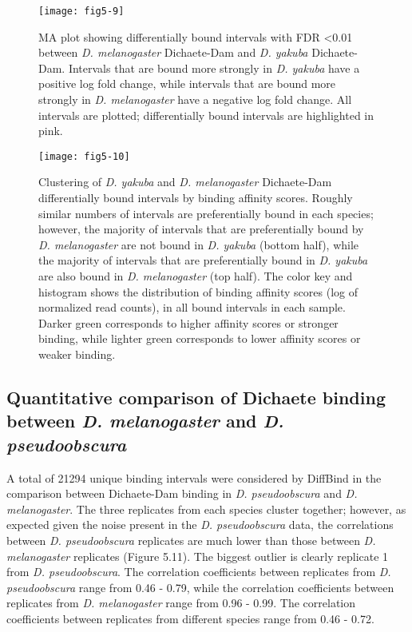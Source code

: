 \begin{figure}
\centering
\texttt{[image: fig5-9]}
\caption[Differentially bound intervals with FDR \textless 0.01 between \emph{D. melanogaster} Dichaete-Dam and \emph{D. yakuba} Dichaete-Dam]{MA plot showing differentially bound intervals with FDR \textless 0.01 between \emph{D. melanogaster} Dichaete-Dam and \emph{D. yakuba} Dichaete-Dam. Intervals that are bound more strongly in \emph{D. yakuba} have a positive log fold change, while intervals that are bound more strongly in \emph{D. melanogaster} have a negative log fold change. All intervals are plotted; differentially bound intervals are highlighted in pink.}
\label{Figure 5.9}
\end{figure}

\begin{figure}
\centering
\texttt{[image: fig5-10]}
\caption[Clustering of \emph{D. yakuba} and \emph{D. melanogaster} Dichaete-Dam differentially bound intervals by binding affinity scores]{Clustering of \emph{D. yakuba} and \emph{D. melanogaster} Dichaete-Dam differentially bound intervals by binding affinity scores. Roughly similar numbers of intervals are preferentially bound in each species; however, the majority of intervals that are preferentially bound by \emph{D. melanogaster} are not bound in \emph{D. yakuba} (bottom half), while the majority of intervals that are preferentially bound in \emph{D. yakuba} are also bound in \emph{D. melanogaster} (top half). The color key and histogram shows the distribution of binding affinity scores (log of normalized read counts), in all bound intervals in each sample. Darker green corresponds to higher affinity scores or stronger binding, while lighter green corresponds to lower affinity scores or weaker binding.}
\label{Figure 5.10}
\end{figure}

\subsection{Quantitative comparison of Dichaete binding between \emph{D. melanogaster} and \emph{D. pseudoobscura}}
A total of 21294 unique binding intervals were considered by DiffBind in the comparison between Dichaete-Dam binding in \emph{D. pseudoobscura} and \emph{D. melanogaster}. The three replicates from each species cluster together; however, as expected given the noise present in the \emph{D. pseudoobscura} data, the correlations between \emph{D. pseudoobscura} replicates are much lower than those between \emph{D. melanogaster} replicates (Figure 5.11). The biggest outlier is clearly replicate 1 from \emph{D. pseudoobscura}. The correlation coefficients between replicates from \emph{D. pseudoobscura} range from 0.46 - 0.79, while the correlation coefficients between replicates from \emph{D. melanogaster} range from 0.96 - 0.99. The correlation coefficients between replicates from different species range from 0.46 - 0.72.

